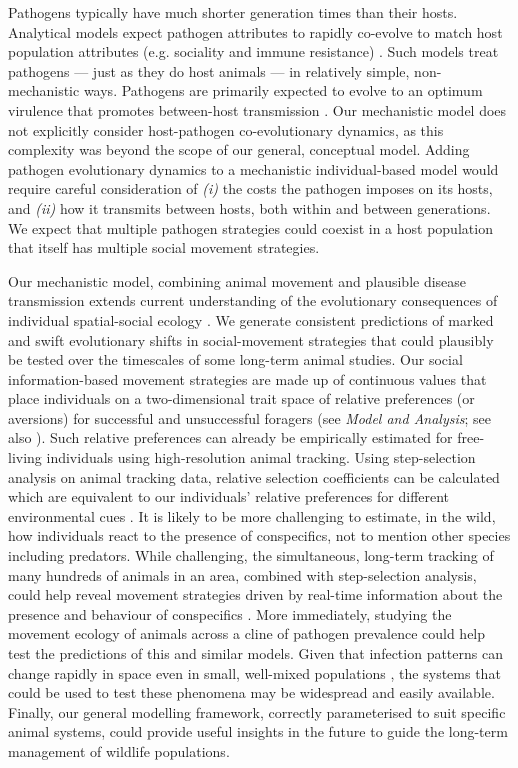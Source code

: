 Pathogens typically have much shorter generation times than their hosts.
Analytical models expect pathogen attributes to rapidly co-evolve to match host population attributes (e.g. sociality and immune resistance) \citep[][]{bonds2005,prado2009,ashby2021}.
Such models treat pathogens --- just as they do host animals --- in relatively simple, non-mechanistic ways.
Pathogens are primarily expected to evolve to an optimum virulence that promotes between-host transmission \citep{bonds2005}.
Our mechanistic model does not explicitly consider host-pathogen co-evolutionary dynamics, as this complexity was beyond the scope of our general, conceptual model.
Adding pathogen evolutionary dynamics to a mechanistic individual-based model would require careful consideration of \textit{(i)} the costs the pathogen imposes on its hosts, and \textit{(ii)} how it transmits between hosts, both within and between generations.
We expect that multiple pathogen strategies could coexist in a host population that itself has multiple social movement strategies.

Our mechanistic model, combining animal movement and plausible disease transmission extends current understanding of the evolutionary consequences of individual spatial-social ecology \citep{webber2018,albery2021}.
We generate consistent predictions of marked and swift evolutionary shifts in social-movement strategies that could plausibly be tested over the timescales of some long-term animal studies.
Our social information-based movement strategies are made up of continuous values that place individuals on a two-dimensional trait space of relative preferences (or aversions) for successful and unsuccessful foragers (see \textit{Model and Analysis}; see also \citealt{gupte2021a}).
Such relative preferences can already be empirically estimated for free-living individuals using high-resolution animal tracking.
Using step-selection analysis on animal tracking data, relative selection coefficients can be calculated which are equivalent to our individuals' relative preferences for different environmental cues \citep{avgar2016,gupte2021a}.
It is likely to be more challenging to estimate, in the wild, how individuals react to the presence of conspecifics, not to mention other species including predators.
While challenging, the simultaneous, long-term tracking of many hundreds of animals in an area, combined with step-selection analysis, could help reveal movement strategies driven by real-time information about the presence and behaviour of conspecifics \citep{nathan2022}.
More immediately, studying the movement ecology of animals across a cline of pathogen prevalence could help test the predictions of this and similar models.
Given that infection patterns can change rapidly in space even in small, well-mixed populations \citep{albery2022}, the systems that could be used to test these phenomena may be widespread and easily available.
Finally, our general modelling framework, correctly parameterised to suit specific animal systems, could provide useful insights in the future to guide the long-term management of wildlife populations.

